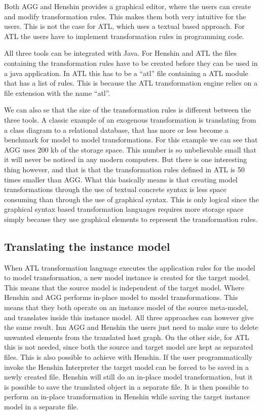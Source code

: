 Both AGG and Henshin provides a graphical editor, where the users can create and
modify transformation rules. This makes them both very intuitive for the users.
This is not the case for ATL, which uses a textual based approach. For ATL the
users have to implement transformation rules in programming code.

All three tools can be integrated with Java. For Henshin and ATL the files
containing the transformation rules have to be created before they can be used
in a java application. In ATL this has to be a ``atl'' file containing a ATL
module that has a list of rules. This is because the ATL transformation engine
relies on a file extension with the name ``atl''.



We can also se that the size of the transformation rules is different
between the three tools. A classic example of an exogenous transformation is
translating from a class diagram to a relational database, that has more or less become a
benchmark for model to model transformations. For this example we can see that
AGG uses 200 kb of the storage space. This number is so unbelievable small
that it will never be noticed in any modern computers. But there is one
interesting thing however, and that is that the transformation rules defined in
ATL is 50 times smaller than AGG. What this basically means is that creating model
transformations through the use of textual concrete syntax is less space
consuming than through the use of graphical syntax. This is only logical since
the graphical syntax based transformation languages requires more storage
space simply because they use graphical elements to represent the transformation
rules.

\subsection{Translating the instance model}

When ATL transformation language executes the application rules for the model to
model transformation, a new model instance is created for the target model. This
means that the source model is independent of the target model. Where Henshin
and AGG performs in-place model to model transformations. This means that they
both operate on an instance model of the source meta-model, and translates
inside this instance model. All three approaches can however give the same
result. Inn AGG and Henshin the users just need to make sure to delete unwanted
elements from the translated host graph. On the other side, for ATL this is not
needed, since both the source and target model are kept as separated files. This
is also possible to achieve with Henshin. If the user programmatically invoke
the Henshin Interpreter the target model can be forced to be saved in a newly
created file. Henshin will still do an in-place model transformation, but it is
possible to save the translated object in a separate file. It is then possible
to perform an in-place transformation in Henshin while saving the target
instance model in a separate file. 

